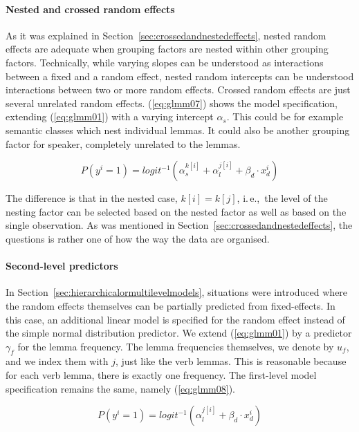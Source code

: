 \documentclass[a4paper,12pt]{article}
\newcommand{\ie}{i.\,e.,\ }
\begin{document}
\paragraph{Nested and crossed random effects}

As it was explained in Section~\ref{sec:crossedandnestedeffects}, nested random effects are adequate when grouping factors are nested within other grouping factors.
Technically, while varying slopes can be understood as interactions between a fixed and a random effect, nested random intercepts can be understood interactions between two or more random effects.
Crossed random effects are just several unrelated random effects.
(\ref{eq:glmm07}) shows the model specification, extending (\ref{eq:glmm01}) with a varying intercept $\alpha_s$.
This could be for example semantic classes which nest individual lemmas.
It could also be another grouping factor for speaker, completely unrelated to the lemmas.

\begin{equation}
  P(y^i=1)=logit^{-1}(\alpha_{s}^{k[i]}+\alpha_{l}^{j[i]}+\beta_d\cdot x_d^i)
  \label{eq:glmm07}
\end{equation}

The difference is that in the nested case, $k[i]=k[j]$, \ie the level of the nesting factor can be selected based on the nested factor as well as based on the single observation.
As was mentioned in Section~\ref{sec:crossedandnestedeffects}, the questions is rather one of how the way the data are organised.

\paragraph{Second-level predictors}

In Section~\ref{sec:hierarchicalormultilevelmodels}, situations were introduced where the random effects themselves can be partially predicted from fixed-effects.
In this case, an additional linear model is specified for the random effect instead of the simple normal distribution predictor.
We extend (\ref{eq:glmm01}) by a predictor $\gamma_f$ for the lemma frequency.
The lemma frequencies themselves, we denote by $u_f$, and we index them with $j$, just like the verb lemmas.
This is reasonable because for each verb lemma, there is exactly one frequency.
The first-level model specification remains the same, namely (\ref{eq:glmm08}).

\begin{equation}
  P(y^i=1)=logit^{-1}(\alpha_{l}^{j[i]}+\beta_d\cdot x_d^i)
  \label{eq:glmm08}
\end{equation}
\end{document}
